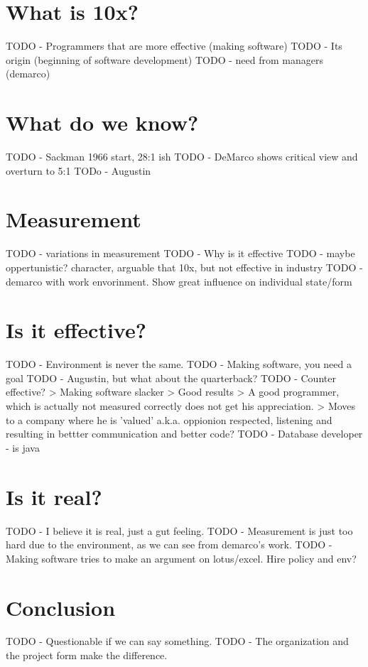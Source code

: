 \section*{What is 10x?}

TODO - Programmers that are more effective (making software)
TODO - Its origin (beginning of software development)
TODO - need from managers (demarco)

\section*{What do we know?}

TODO - Sackman 1966 start, 28:1 ish
TODO - DeMarco shows critical view and overturn to 5:1
TODo - Augustin \autocite{augustine}

\section*{Measurement}

TODO - variations in measurement
TODO - Why is it effective
TODO - maybe oppertunistic? character, arguable that 10x, but not effective in industry
TODO - demarco with work envorinment. Show great influence on individual state/form

\section*{Is it effective?}

TODO - Environment is never the same.
TODO - Making software, you need a goal
TODO - Augustin, but what about the quarterback?
TODO - Counter effective?
   > Making software slacker
   > Good results
   > A good programmer, which is actually not measured correctly does not get his appreciation.
   > Moves to a company where he is 'valued' a.k.a. oppionion respected, listening and resulting in bettter communication and better code?
TODO - Database developer - is java
\section*{Is it real?}

TODO - I believe it is real, just a gut feeling.
TODO - Measurement is just too hard due to the environment, as we can see from demarco's work.
TODO - Making software tries to make an argument on lotus/excel. Hire policy and env?

\section*{Conclusion}

TODO - Questionable if we can say something.
TODO - The organization and the project form make the difference.

